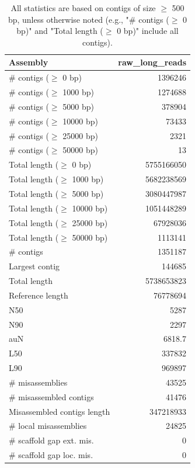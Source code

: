 \documentclass[12pt,a4paper]{article}
\begin{document}
\begin{table}[ht]
\begin{center}
\caption{All statistics are based on contigs of size $\geq$ 500 bp, unless otherwise noted (e.g., "\# contigs ($\geq$ 0 bp)" and "Total length ($\geq$ 0 bp)" include all contigs).}
\begin{tabular}{|l*{1}{|r}|}
\hline
Assembly & raw\_long\_reads \\ \hline
\# contigs ($\geq$ 0 bp) & 1396246 \\ \hline
\# contigs ($\geq$ 1000 bp) & 1274688 \\ \hline
\# contigs ($\geq$ 5000 bp) & 378904 \\ \hline
\# contigs ($\geq$ 10000 bp) & 73433 \\ \hline
\# contigs ($\geq$ 25000 bp) & 2321 \\ \hline
\# contigs ($\geq$ 50000 bp) & 13 \\ \hline
Total length ($\geq$ 0 bp) & 5755166050 \\ \hline
Total length ($\geq$ 1000 bp) & 5682238569 \\ \hline
Total length ($\geq$ 5000 bp) & 3080447987 \\ \hline
Total length ($\geq$ 10000 bp) & 1051448289 \\ \hline
Total length ($\geq$ 25000 bp) & 67928036 \\ \hline
Total length ($\geq$ 50000 bp) & 1113141 \\ \hline
\# contigs & 1351187 \\ \hline
Largest contig & 144685 \\ \hline
Total length & 5738653823 \\ \hline
Reference length & 76778694 \\ \hline
N50 & 5287 \\ \hline
N90 & 2297 \\ \hline
auN & 6818.7 \\ \hline
L50 & 337832 \\ \hline
L90 & 969897 \\ \hline
\# misassemblies & 43525 \\ \hline
\# misassembled contigs & 41476 \\ \hline
Misassembled contigs length & 347218933 \\ \hline
\# local misassemblies & 24825 \\ \hline
\# scaffold gap ext. mis. & 0 \\ \hline
\# scaffold gap loc. mis. & 0 \\ \hline

\end{tabular}
\end{center}
\end{table}
\end{document}
